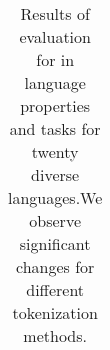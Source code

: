 \begin{landscape}
\begin{table}
{\begin{tabular}{lllllllllllllllllllllll}
\bottomrule
\end{tabular}
}
\caption{Results of evaluation for in language properties and tasks for twenty diverse languages.We observe significant changes for different tokenization methods.}
\label{tab:in_lang_table_20l}
\end{table}
\end{landscape}